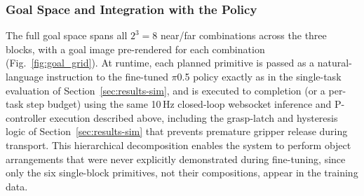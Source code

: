 \documentclass[12pt]{article}
\begin{document}
\subsubsection{Goal Space and Integration with the Policy}
The full goal space spans all $2^3 = 8$ near/far combinations across the three blocks, with a goal image pre-rendered for each combination (Fig.~\ref{fig:goal_grid}). At runtime, each planned primitive is passed as a natural-language instruction to the fine-tuned $\pi$0.5 policy exactly as in the single-task evaluation of Section~\ref{sec:results-sim}, and is executed to completion (or a per-task step budget) using the same 10\,Hz closed-loop websocket inference and P-controller execution described above, including the grasp-latch and hysteresis logic of Section~\ref{sec:results-sim} that prevents premature gripper release during transport. This hierarchical decomposition enables the system to perform object arrangements that were never explicitly demonstrated during fine-tuning, since only the six single-block primitives, not their compositions, appear in the training data.
\end{document}
